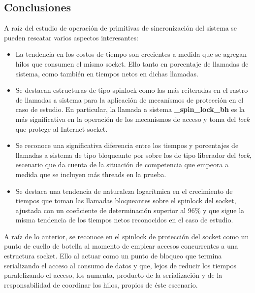 \subsection{Conclusiones}
A raíz del estudio de operación de primitivas de sincronización del sistema se pueden rescatar varios aspectos interesantes:
\begin{itemize}
\item La tendencia en los costos de tiempo son crecientes a medida que se agregan hilos que consumen el mismo socket. Ello tanto en porcentaje de llamadas de sistema, como también en tiempos netos en dichas llamadas.
\item Se destacan estructuras de tipo spinlock como las más reiteradas en el rastro de llamadas a sistema para la aplicación de mecanísmos de protección en el caso de estudio. En particular, la llamada a sistema \textbf{\_spin\_lock\_bh} es la más significativa en la operación de los mecanismos de acceso y toma del \emph{lock} que protege al Internet socket.
\item Se reconoce una significativa diferencia entre los tiempos y porcentajes de llamadas a sistema de tipo bloqueante por sobre los de tipo liberador del \emph{lock}, escenario que da cuenta de la situación de competencia que empeora a medida que se incluyen más threads en la prueba.
\item Se destaca una tendencia de naturaleza logarítmica en el crecimiento de tiempos que toman las llamadas bloqueantes sobre el spinlock del socket, ajustada con un coeficiente de determinación superior al 96\% y que sigue la misma tendencia de los tiempos netos reconocidos en el caso de estudio.
\end{itemize}
A raíz de lo anterior, se reconoce en el spinlock de protección del socket como un punto de cuello de botella al momento de emplear accesos concurrentes a una estructura socket. Ello al actuar como un punto de bloqueo que termina serializando el acceso al consumo de datos y que, lejos de reducir los tiempos paralelizando el acceso, los aumenta, producto de la serialización y de la responsabilidad de coordinar los hilos, propios de éste escenario.


